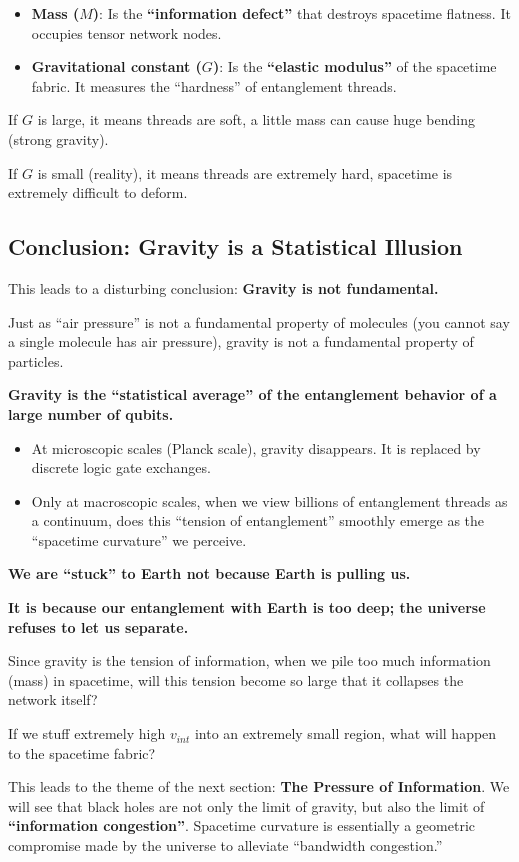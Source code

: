 \begin{itemize}
\item \textbf{Mass ($M$)}: Is the \textbf{``information defect''} that destroys spacetime flatness. It occupies tensor network nodes.

\item \textbf{Gravitational constant ($G$)}: Is the \textbf{``elastic modulus''} of the spacetime fabric. It measures the ``hardness'' of entanglement threads.
\end{itemize}

If $G$ is large, it means threads are soft, a little mass can cause huge bending (strong gravity).

If $G$ is small (reality), it means threads are extremely hard, spacetime is extremely difficult to deform.

\subsection{Conclusion: Gravity is a Statistical Illusion}

This leads to a disturbing conclusion: \textbf{Gravity is not fundamental.}

Just as ``air pressure'' is not a fundamental property of molecules (you cannot say a single molecule has air pressure), gravity is not a fundamental property of particles.

\textbf{Gravity is the ``statistical average'' of the entanglement behavior of a large number of qubits.}

\begin{itemize}
\item At microscopic scales (Planck scale), gravity disappears. It is replaced by discrete logic gate exchanges.

\item Only at macroscopic scales, when we view billions of entanglement threads as a continuum, does this ``tension of entanglement'' smoothly emerge as the ``spacetime curvature'' we perceive.
\end{itemize}

\textbf{We are ``stuck'' to Earth not because Earth is pulling us.}

\textbf{It is because our entanglement with Earth is too deep; the universe refuses to let us separate.}

Since gravity is the tension of information, when we pile too much information (mass) in spacetime, will this tension become so large that it collapses the network itself?

If we stuff extremely high \textbf{$v_{int}$} into an extremely small region, what will happen to the spacetime fabric?

This leads to the theme of the next section: \textbf{The Pressure of Information}. We will see that black holes are not only the limit of gravity, but also the limit of \textbf{``information congestion''}. Spacetime curvature is essentially a geometric compromise made by the universe to alleviate ``bandwidth congestion.''

